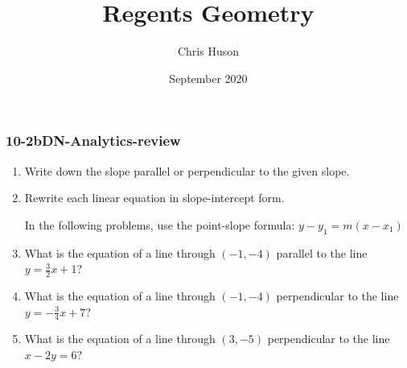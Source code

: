 \documentclass[12pt, twoside]{article}
\title{Regents Geometry}
\author{Chris Huson}
\date{September 2020}
\begin{document}
\subsubsection*{10-2bDN-Analytics-review}
\begin{enumerate}
\item Write down the slope parallel or perpendicular to the given slope. \vspace{0.5cm}
  \begin{enumerate}
  \end{enumerate}\vspace{0.15cm}

\item Rewrite each linear equation in slope-intercept form.
  \begin{enumerate}
  \end{enumerate}  \vspace{3cm}

  In the following problems, use the point-slope formula: $y-y_1=m (x-x_1)$
\item What is the equation of a line through $(-1,-4)$ parallel to the line $y=\frac{3}{2}x+1$?  \vspace{3cm}
\item What is the equation of a line through $(-1,-4)$ perpendicular to the line $y=-\frac{3}{4}x+7$?  \vspace{3cm}
\item What is the equation of a line through $(3,-5)$ perpendicular to the line $x-2y=6$?  \vspace{3cm}


\end{enumerate}
\end{document}
